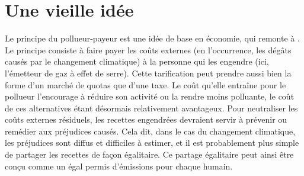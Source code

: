 \documentclass[a5paper,french]{memoir}
\begin{document}
\section{Une vieille idée} %

Le principe du pollueur-payeur est une idée de base en économie, qui remonte à \citet{pigou_economics_1920}. Le principe consiste à faire payer les coûts externes (en l'occurrence, les dégâts causés par le changement climatique) à la personne qui les engendre (ici, l'émetteur de gaz à effet de serre). Cette tarification peut prendre aussi bien la forme d'un marché de quotas que d'une taxe. Le coût qu'elle entraîne pour le pollueur l'encourage à réduire son activité ou la rendre moins polluante, le coût de ces alternatives étant désormais relativement avantageux. Pour neutraliser les coûts externes résiduels, les recettes engendrées devraient servir à prévenir ou remédier aux préjudices causés. Cela dit, dans le cas du changement climatique, les préjudices sont diffus et difficiles à estimer, et il est probablement plus simple de partager les recettes de façon égalitaire. Ce partage égalitaire peut ainsi être conçu comme un égal permis d'émissions pour chaque humain. 
\end{document}
